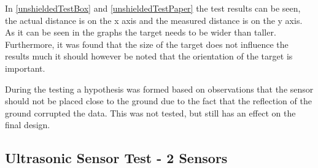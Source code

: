 



In \autoref{unshieldedTestBox} and \autoref{unshieldedTestPaper} the test
results can be seen, the actual distance is on the x axis and the measured
distance is on the y axis. As it can be seen in the graphs the target needs to
be wider than taller. Furthermore, it was found that the size of the target does
not influence the results much it should however be noted that the orientation
of the target is important. \nl
% 

During the testing a hypothesis was formed based on observations that the sensor
should not be placed close to the ground due to the fact that the reflection of
the ground corrupted the data. This was not tested, but still has an effect on the
final design. 

\subsection{Ultrasonic Sensor Test - 2 Sensors}

